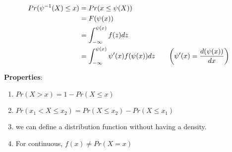 \begin{align*}
    Pr(\psi^{-1}(X) \leq x) 
    &= Pr(x\leq\psi(X)) \\
    &= F(\psi(x)) \\
    &= \displaystyle\int_{-\infty}^{\psi(x)} f(z)dz\\
    &= \displaystyle\int_{-\infty}^{\psi(x)} \psi'(x) f(\psi(x))dz &&& \left( \psi'(x) = \dfrac{d(\psi(x))}{dx} \right)\\
\end{align*}

\textbf{Properties}:
\begin{enumerate}
    \item $Pr(X > x) = 1 - Pr(X \leq x)$

    \item $Pr(x_1 < X \leq x_2) = Pr(X \leq x_2) - Pr(X \leq x_1)$

    \item we can define a distribution function without having a density. 

    \item For continuous, $f(x) \neq Pr(X = x)$

\end{enumerate}




































